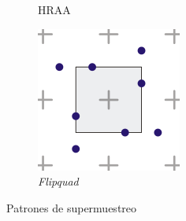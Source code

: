 \begin{figure}[htbp]
\begin{subfigure}[b]{0.25\textwidth}
        \caption{HRAA}
    \end{subfigure}
    \hfill
    \begin{subfigure}[b]{0.25\textwidth}
        \centering
        \includegraphics[width=\textwidth]{Plantilla-TFG-master/img/aa6.png}
        \caption{\textit{Flipquad}}
    \end{subfigure}
    \caption{Patrones de supermuestreo \cite{supersamp}}
    \label{fig:patrones}
\end{figure}

